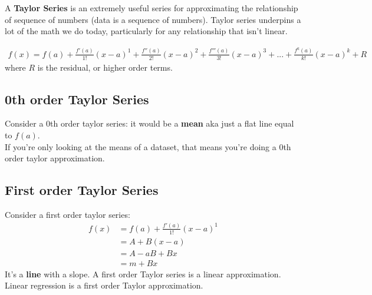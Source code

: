 \documentclass{article}
\begin{document}
A \textbf{Taylor Series} is an extremely useful series for approximating the relationship of sequence of numbers (data is a sequence of numbers). Taylor series underpins a lot of the math we do today, particularly for any relationship that isn't linear. 

\begin{align}
    f(x) = f(a) + \frac{f'(a)}{1!}(x-a)^1 + \frac{f''(a)}{2!}(x-a)^2 + \frac{f'''(a)}{3!}(x-a)^3 + ... + \frac{f^k(a)}{k!}(x-a)^k + R
\end{align}
where $R$ is the residual, or higher order terms.\\


\subsection{0th order Taylor Series}
Consider a 0th order taylor series: it would be a \textbf{mean} aka just a flat line equal to $f(a)$. \\

If you're only looking at the means of a dataset, that means you're doing a 0th order taylor approximation.

\subsection{First order Taylor Series}

Consider a first order taylor series: 
\begin{align}
    f(x) &= f(a) + \frac{f'(a)}{1!}(x-a)^1 \\
    &= A + B (x-a) \\
    &= A -aB + Bx\\
    &= m + Bx
\end{align}
It's a \textbf{line} with a slope. A first order Taylor series is a linear approximation. Linear regression is a first order Taylor approximation. \\





\end{document}
